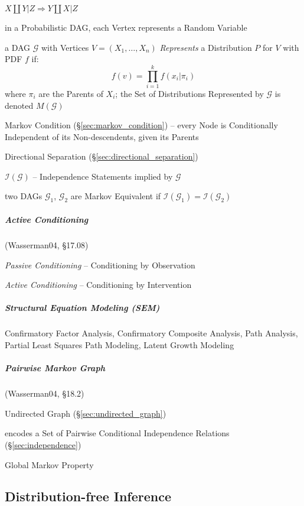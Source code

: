 $X \coprod Y | Z \Rightarrow Y \coprod X | Z$

in a Probabilistic DAG, each Vertex represents a Random Variable

a DAG $\mathcal{G}$ with Vertices $V = (X_1, \ldots, X_n)$ \emph{Represents} a
Distribution $P$ for $V$ with PDF $f$ if:
\[
  f(v) = \prod_{i=1}^k f(x_i | \pi_i)
\]
where $\pi_i$ are the Parents of $X_i$; the Set of Distributions Represented by
$\mathcal{G}$ is denoted $M(\mathcal{G})$

Markov Condition (\S\ref{sec:markov_condition}) -- every Node is Conditionally
Independent of its Non-descendents, given its Parents

Directional Separation (\S\ref{sec:directional_separation})

$\mathcal{I}(\mathcal{G})$ -- Independence Statements implied by $\mathcal{G}$

two DAGs $\mathcal{G}_1$, $\mathcal{G}_2$ are Markov Equivalent if
$\mathcal{I}(\mathcal{G}_1) = \mathcal{I}(\mathcal{G}_2)$



\subparagraph{Active Conditioning}\label{sec:active_conditioning}\hfill

(Wasserman04, \S17.08)

\emph{Passive Conditioning} -- Conditioning by Observation

\emph{Active Conditioning} -- Conditioning by Intervention



\subparagraph{Structural Equation Modeling (SEM)}\label{sec:sem}\hfill


Confirmatory Factor Analysis, Confirmatory Composite Analysis, Path Analysis,
Partial Least Squares Path Modeling, Latent Growth Modeling



\subparagraph{Pairwise Markov Graph}\label{sec:pairwise_markov}\hfill

(Wasserman04, \S18.2)

Undirected Graph (\S\ref{sec:undirected_graph})

encodes a Set of Pairwise Conditional Independence Relations
(\S\ref{sec:independence})

Global Markov Property



\subsection{Distribution-free Inference}\label{sec:distribution_free}

